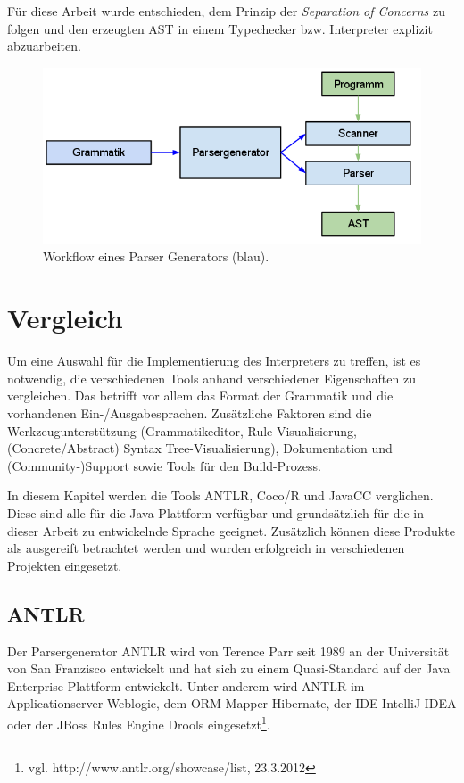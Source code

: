 Für diese Arbeit wurde entschieden, dem Prinzip der \emph{Separation of Concerns} zu folgen und den erzeugten AST in einem Typechecker bzw. Interpreter explizit abzuarbeiten.

 

\begin{figure}[h]
\includegraphics[scale=0.6]{figures/parser_generator_workflow}
\caption{Workflow eines Parser Generators (blau).}
\label{abb_parser_generator_workflow}
\end{figure}



\section{Vergleich}
\label{tools_vergleich}

Um eine Auswahl für die Implementierung des Interpreters zu treffen, ist es notwendig, die verschiedenen Tools anhand verschiedener Eigenschaften zu vergleichen. Das betrifft vor allem das Format der Grammatik und die vorhandenen Ein-/Ausgabesprachen.
Zusätzliche Faktoren sind die Werkzeugunterstützung (Grammatikeditor, Rule-Visualisierung, (Concrete/Abstract) Syntax Tree-Visualisierung), Dokumentation und (Community-)Support sowie Tools für den Build-Prozess.

In diesem Kapitel werden die Tools ANTLR, Coco/R und JavaCC verglichen. Diese sind alle für die Java-Plattform verfügbar und grundsätzlich für die in dieser Arbeit zu entwickelnde Sprache geeignet. Zusätzlich können diese Produkte als ausgereift betrachtet werden und wurden erfolgreich in verschiedenen Projekten eingesetzt.


\subsection{ANTLR}

Der Parsergenerator ANTLR wird von Terence Parr seit 1989 an der Universität von San Franzisco entwickelt und hat sich zu einem Quasi-Standard auf der Java Enterprise Plattform entwickelt. Unter anderem wird ANTLR im Applicationserver Weblogic, dem ORM-Mapper Hibernate, der IDE IntelliJ IDEA oder der JBoss Rules Engine Drools eingesetzt\footnote{vgl. http://www.antlr.org/showcase/list, 23.3.2012}.

